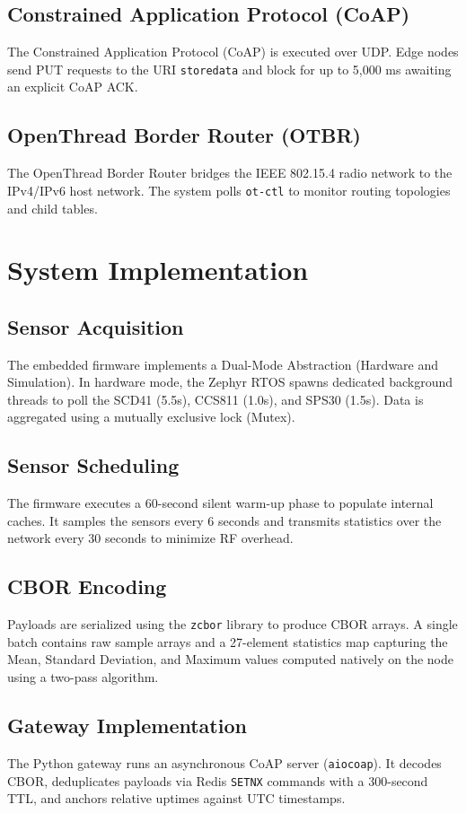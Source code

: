 \documentclass[conference]{IEEEtran}
\begin{document}
\subsection{Constrained Application Protocol (CoAP)}
The Constrained Application Protocol (CoAP) \cite{b8} is executed over UDP. Edge nodes send PUT requests to the URI \texttt{storedata} and block for up to 5,000 ms awaiting an explicit CoAP ACK.

\subsection{OpenThread Border Router (OTBR)}
The OpenThread Border Router bridges the IEEE 802.15.4 radio network to the IPv4/IPv6 host network. The system polls \texttt{ot-ctl} to monitor routing topologies and child tables.

\section{System Implementation}
\subsection{Sensor Acquisition}
\label{sec:sensoracq}
The embedded firmware implements a Dual-Mode Abstraction (Hardware and Simulation). In hardware mode, the Zephyr RTOS spawns dedicated background threads to poll the SCD41 (5.5s), CCS811 (1.0s), and SPS30 (1.5s). Data is aggregated using a mutually exclusive lock (Mutex).

\subsection{Sensor Scheduling}
The firmware executes a 60-second silent warm-up phase to populate internal caches. It samples the sensors every 6 seconds and transmits statistics over the network every 30 seconds to minimize RF overhead.

\subsection{CBOR Encoding}
Payloads are serialized using the \texttt{zcbor} library to produce CBOR \cite{b9} arrays. A single batch contains raw sample arrays and a 27-element statistics map capturing the Mean, Standard Deviation, and Maximum values computed natively on the node using a two-pass algorithm.

\subsection{Gateway Implementation}
The Python gateway runs an asynchronous CoAP server (\texttt{aiocoap}). It decodes CBOR, deduplicates payloads via Redis \texttt{SETNX} commands with a 300-second TTL, and anchors relative uptimes against UTC timestamps.
\end{document}
